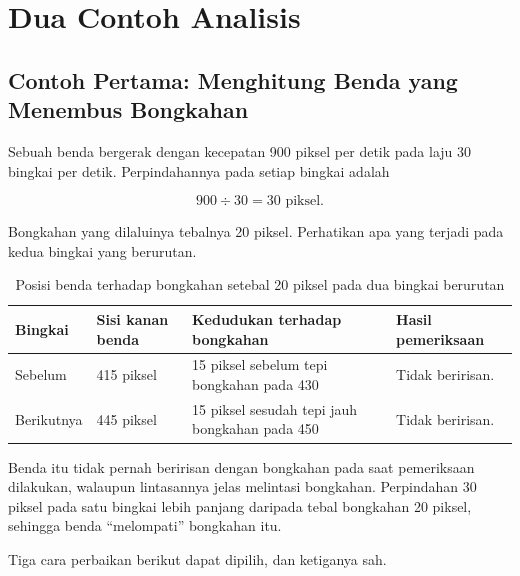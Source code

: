\section{Dua Contoh Analisis}
\label{sec:contoh-bab-7}

\subsection{Contoh Pertama: Menghitung Benda yang Menembus Bongkahan}

\begin{contohbox}
Sebuah benda bergerak dengan kecepatan 900 piksel per detik pada laju 30
bingkai per detik. Perpindahannya pada setiap bingkai adalah

\[
900 \div 30 = 30 \text{ piksel}.
\]

Bongkahan yang dilaluinya tebalnya 20 piksel. Perhatikan apa yang terjadi pada
kedua bingkai yang berurutan.
\end{contohbox}

\begin{table}[htbp]
\centering
\caption{Posisi benda terhadap bongkahan setebal 20 piksel pada dua bingkai berurutan}
\label{tab:tunneling}
{\setlength{\tabcolsep}{4pt}\footnotesize%
\begin{tabularx}{\textwidth}{@{}C{1.6cm} C{3.4cm} C{3.6cm} Y@{}}
\toprule
\headrow \textbf{Bingkai} & \textbf{Sisi kanan benda} & \textbf{Kedudukan terhadap bongkahan} & \textbf{Hasil pemeriksaan} \\
\midrule
Sebelum & 415 piksel & 15 piksel sebelum tepi bongkahan pada 430 & Tidak beririsan. \\
\addlinespace
Berikutnya & 445 piksel & 15 piksel sesudah tepi jauh bongkahan pada 450 & Tidak beririsan. \\
\bottomrule
\end{tabularx}}
\end{table}

Benda itu tidak pernah beririsan dengan bongkahan pada saat pemeriksaan
dilakukan, walaupun lintasannya jelas melintasi bongkahan. Perpindahan 30
piksel pada satu bingkai lebih panjang daripada tebal bongkahan 20 piksel,
sehingga benda ``melompati'' bongkahan itu.

Tiga cara perbaikan berikut dapat dipilih, dan ketiganya sah.

